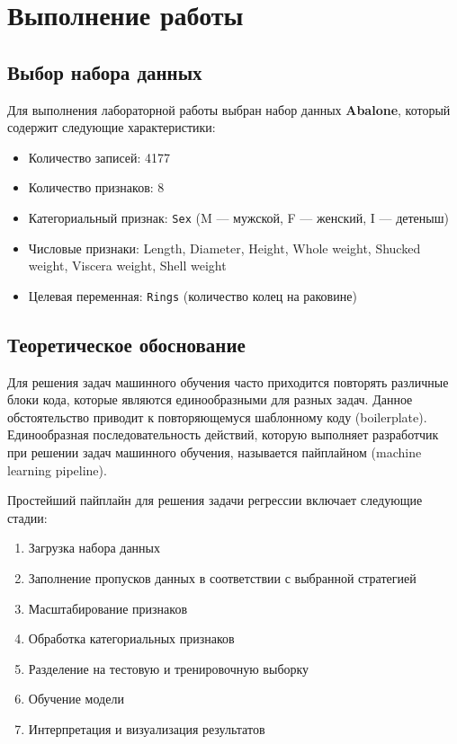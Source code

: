 \chapter{Выполнение работы}
\label{ch:chapter_lab5}

\section{Выбор набора данных}

Для выполнения лабораторной работы выбран набор данных \textbf{Abalone}, который содержит следующие характеристики:

\begin{itemize}
    \item Количество записей: 4177
    \item Количество признаков: 8
    \item Категориальный признак: \texttt{Sex} (M --- мужской, F --- женский, I --- детеныш)
    \item Числовые признаки: Length, Diameter, Height, Whole weight, Shucked weight, Viscera weight, Shell weight
    \item Целевая переменная: \texttt{Rings} (количество колец на раковине)
\end{itemize}

\section{Теоретическое обоснование}

Для решения задач машинного обучения часто приходится повторять различные блоки кода, которые являются единообразными для разных задач. Данное обстоятельство приводит к повторяющемуся шаблонному коду (boilerplate). Единообразная последовательность действий, которую выполняет разработчик при решении задач машинного обучения, называется пайплайном (machine learning pipeline).

Простейший пайплайн для решения задачи регрессии включает следующие стадии:

\begin{enumerate}
    \item Загрузка набора данных
    \item Заполнение пропусков данных в соответствии с выбранной стратегией
    \item Масштабирование признаков
    \item Обработка категориальных признаков
    \item Разделение на тестовую и тренировочную выборку
    \item Обучение модели
    \item Интерпретация и визуализация результатов
\end{enumerate}

